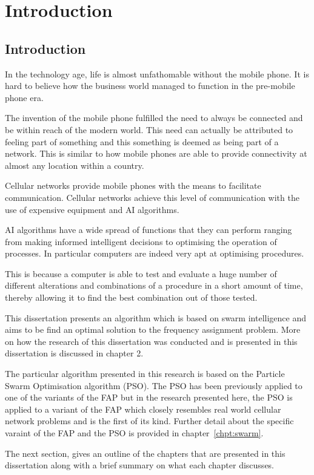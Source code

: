 \chapter{Introduction}
\section{Introduction}
In the technology age, life is almost unfathomable without the mobile phone. It is hard to believe how the business world managed to function in the pre-mobile phone era.

The invention of the mobile phone fulfilled the need to always be connected and be within reach of the modern world. This need can actually be attributed to feeling part of something and this something is deemed as being part of a network. This is similar to how mobile phones are able to provide connectivity at almost any location within a country.

Cellular networks provide mobile phones with the means to facilitate communication. Cellular networks achieve this level of communication with the use of expensive equipment and \gls{AI} algorithms.

\gls{AI} algorithms have a wide spread of functions that they can perform ranging from making informed intelligent decisions to optimising the operation of processes. In particular computers are indeed very apt at optimising procedures. 

This is because a computer is able to test and evaluate a huge number of different alterations and combinations of a procedure in a short amount of time, thereby allowing it to find the best combination out of those tested.

This dissertation presents an algorithm which is based on swarm intelligence and aims to be find an optimal solution to the frequency assignment problem. More on how the research of this dissertation was conducted and is presented in this dissertation is discussed in chapter 2.

The particular algorithm presented in this research is based on the Particle Swarm Optimisation algorithm (PSO). The PSO has been previously applied to one of the variants of the FAP but in the research presented here, the PSO is applied to a variant of the FAP which closely resembles real world cellular network problems and is the first of its kind. Further detail about the specific varaint of the FAP and the PSO is provided in chapter~\ref{chpt:swarm}.

The next section, gives an outline of the chapters that are presented in this dissertation along with a brief summary on what each chapter discusses.

